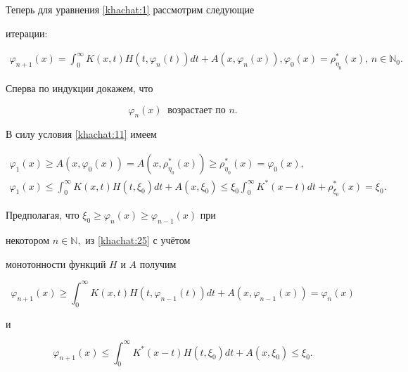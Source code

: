 \noindent

Теперь для уравнения \eqref{khachat:1} рассмотрим следующие

итерации:

\begin{gather} \!\!\!

\varphi_{n+1}(x){=}\int _{0}^{\infty}

K(x,t)H(t,\varphi_n(t))dt{+}A(x,\varphi_n(x)),

\varphi_0(x)=\rho_{\eta_0}^*(x),\, n\in\mathbb{N}_0.

\label{khachat:25}

\end{gather}

Сперва по индукции докажем, что

\begin{equation}

\varphi_n(x) \ \text{ возрастает по $n.$} \label{khachat:26}

\end{equation}

 В силу условия \eqref{khachat:11} имеем

\begin{gather*}

\varphi_1(x)\geq

A(x,\varphi_0(x))=A(x,\rho_{\eta_0}^*(x))\geq\rho_{\eta_0}^*(x)=\varphi_0(x),\\

\varphi_1(x)\leq \int _{0}^{\infty} K(x,t)H(t,\xi_0)dt+A(x,\xi_0)\leq

\xi_0\int _{0}^{\infty}K^*(x-t)dt+\rho_{\xi_0}^*(x)=\xi_0.

\end{gather*}

Предполагая, что $\xi_0\geq\varphi_n(x)\geq\varphi_{n-1}(x)$ при

некотором $n\in\mathbb{N},$  из \eqref{khachat:25} с учётом

монотонности функций $H$ и $A$ получим

$$

\varphi_{n+1}(x)\geq\int _{0}^{\infty}K(x,t)H(t,\varphi_{n-1}(t))dt+A(x,\varphi_{n-1}(x))=\varphi_n(x)

$$

и

$$

\varphi_{n+1}(x)\leq\int _{0}^{\infty}K^*(x-t)H(t,\xi_0)dt+A(x,\xi_0)\leq\xi_0.

$$



